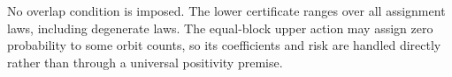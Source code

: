 No overlap condition is imposed.  The lower certificate ranges over all assignment laws, including degenerate laws.  The equal-block upper action may assign zero probability to some orbit counts, so its coefficients and risk are handled directly rather than through a universal positivity premise.